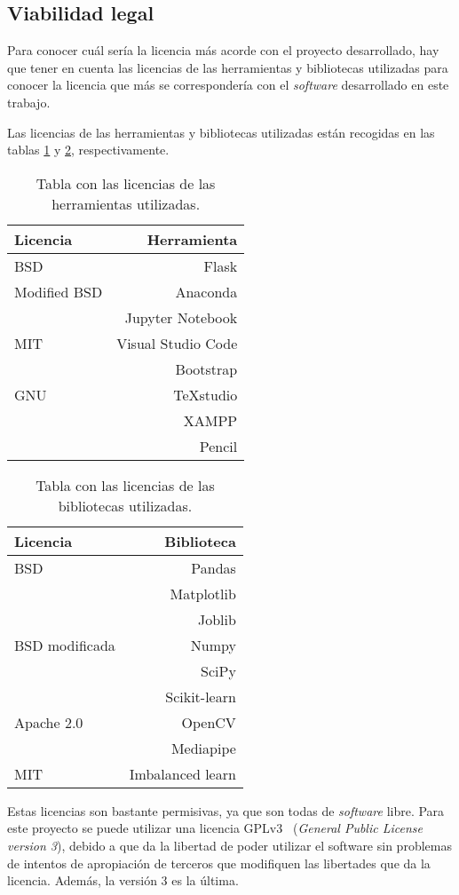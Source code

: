 \subsection{Viabilidad legal}
Para conocer cuál sería la licencia más acorde con el proyecto desarrollado, hay que tener en cuenta las licencias de las herramientas y bibliotecas utilizadas para conocer la licencia que más se correspondería con el \textit{software} desarrollado en este trabajo. 

Las licencias de las herramientas y bibliotecas utilizadas están recogidas en las tablas \ref{tab:licencias_herr} y \ref{tab:licencias_bib}, respectivamente.

\begin{table}[h]
	\begin{center}
		\begin{tabular}{ l r }
			\toprule
			\textbf{Licencia} & \textbf{Herramienta} \\ \midrule
			BSD & Flask \\ \midrule
			Modified BSD & Anaconda \\ 
			& Jupyter Notebook \\ \midrule
			MIT & Visual Studio Code \\
			& Bootstrap \\ \midrule
			GNU & TeXstudio \\
			& XAMPP \\ 
			& Pencil \\ \bottomrule
		\end{tabular}
		\caption{Tabla con las licencias de las herramientas utilizadas.}
		\label{tab:licencias_herr}
	\end{center}
\end{table}

\begin{table}[h]
	\begin{center}
		\begin{tabular}{ l r }
			\toprule
			\textbf{Licencia} & \textbf{Biblioteca} \\ \midrule
			BSD & Pandas \\
			& Matplotlib \\
			& Joblib \\ \midrule
			BSD modificada & Numpy \\ 
			& SciPy \\
			& Scikit-learn \\ \midrule
			Apache 2.0 & OpenCV \\ 
			& Mediapipe \\ \midrule
			MIT & Imbalanced learn \\ \bottomrule
		\end{tabular}
		\caption{Tabla con las licencias de las bibliotecas utilizadas.}
		\label{tab:licencias_bib}
	\end{center}
\end{table}

Estas licencias son bastante permisivas, ya que son todas de \textit{software} libre. Para este proyecto se puede utilizar una licencia GPLv3~\cite{wiki:gpl} (\textit{General Public License version 3}), debido a que da la libertad de poder utilizar el software sin problemas de intentos de apropiación de terceros que modifiquen las libertades que da la licencia. Además, la versión 3 es la última.
